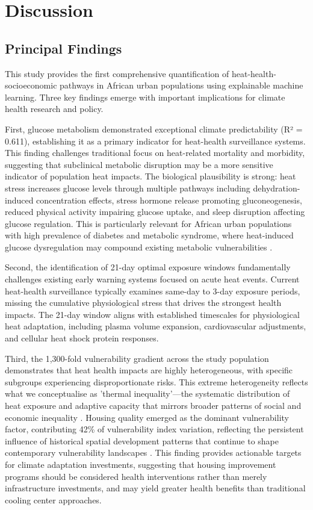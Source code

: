 \documentclass[11pt,a4paper]{article}
\begin{document}
\section{Discussion}

\subsection{Principal Findings}

This study provides the first comprehensive quantification of heat-health-socioeconomic pathways in African urban populations using explainable machine learning. Three key findings emerge with important implications for climate health research and policy.

First, glucose metabolism demonstrated exceptional climate predictability (R² = 0.611), establishing it as a primary indicator for heat-health surveillance systems. This finding challenges traditional focus on heat-related mortality and morbidity, suggesting that subclinical metabolic disruption may be a more sensitive indicator of population heat impacts. The biological plausibility is strong: heat stress increases glucose levels through multiple pathways including dehydration-induced concentration effects, stress hormone release promoting gluconeogenesis, reduced physical activity impairing glucose uptake, and sleep disruption affecting glucose regulation. This is particularly relevant for African urban populations with high prevalence of diabetes and metabolic syndrome, where heat-induced glucose dysregulation may compound existing metabolic vulnerabilities \cite{khine2023implications}.

Second, the identification of 21-day optimal exposure windows fundamentally challenges existing early warning systems focused on acute heat events. Current heat-health surveillance typically examines same-day to 3-day exposure periods, missing the cumulative physiological stress that drives the strongest health impacts. The 21-day window aligns with established timescales for physiological heat adaptation, including plasma volume expansion, cardiovascular adjustments, and cellular heat shock protein responses.

Third, the 1,300-fold vulnerability gradient across the study population demonstrates that heat health impacts are highly heterogeneous, with specific subgroups experiencing disproportionate risks. This extreme heterogeneity reflects what we conceptualise as 'thermal inequality'—the systematic distribution of heat exposure and adaptive capacity that mirrors broader patterns of social and economic inequality \cite{mitchell2018thermal}. Housing quality emerged as the dominant vulnerability factor, contributing 42\% of vulnerability index variation, reflecting the persistent influence of historical spatial development patterns that continue to shape contemporary vulnerability landscapes \cite{strauss2019historical}. This finding provides actionable targets for climate adaptation investments, suggesting that housing improvement programs should be considered health interventions rather than merely infrastructure investments, and may yield greater health benefits than traditional cooling center approaches.
\end{document}
